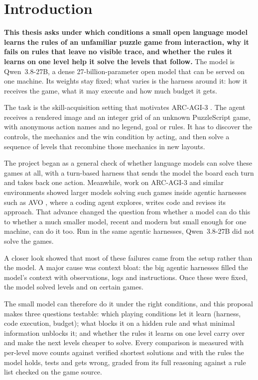 \documentclass[11pt,a4paper]{article}
\newcommand{\qsmall}{Qwen~3.8-27B}
\begin{document}
\tableofcontents
\clearpage
{}
\setcounter{page}{1}

\section{Introduction}
\label{sec:intro}

\textbf{This thesis asks under which conditions a small open language model
learns the rules of an unfamiliar puzzle game from interaction, why it fails
on rules that leave no visible trace, and whether the rules it learns on one
level help it solve the levels that follow.} The model is \qsmall{}, a dense
27-billion-parameter open model that can be served on one machine. Its
weights stay fixed; what varies is the harness around it: how it receives
the game, what it may execute and how much budget it gets.

The task is the skill-acquisition setting that motivates ARC-AGI-3
\citep{arcprize2026arcagi3,chollet2019measure}. The agent receives a rendered
image and an integer grid of an unknown PuzzleScript game, with anonymous
action names and no legend, goal or rules. It has to discover the controls,
the mechanics and the win condition by acting, and then solve a sequence of
levels that recombine those mechanics in new layouts.

The project began as a general check of whether language models can solve
these games at all, with a turn-based harness that sends the model the board
each turn and takes back one action. Meanwhile, work on ARC-AGI-3 and similar
environments showed larger models solving such games inside agentic harnesses
such as AVO \citep{chen2026avo,nvidia2026avoarc}, where a coding agent
explores, writes code and revises its approach. That advance changed the
question from whether a model can do this to whether a much smaller model,
recent and modern but small enough for one machine, can do it too. Run in the
same agentic harnesses, \qsmall{} did not solve the games.

A closer look showed that most of these failures came from the setup rather
than the model. A major cause was context bloat: the big agentic harnesses
filled the model's context with observations, logs and instructions. Once these were fixed, the model solved levels and on certain games.

The small model can therefore do it under the right conditions, and this
proposal makes three questions testable: which playing conditions let it
learn (harness, code execution, budget); what blocks it on a hidden rule and
what minimal information unblocks it; and whether the rules it learns on one
level carry over and make the next levels cheaper to solve. Every comparison
is measured with per-level move counts against verified shortest solutions
and with the rules the model holds, tests and gets wrong, graded from its
full reasoning against a rule list checked on the game source.
\end{document}
